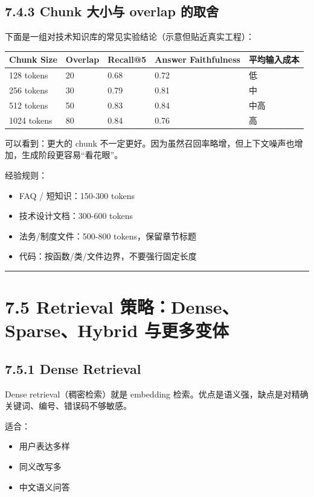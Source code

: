 \subsection{7.4.3 Chunk 大小与 overlap 的取舍}

下面是一组对技术知识库的常见实验结论（示意但贴近真实工程）：


\begingroup
\scriptsize
\setlength{\tabcolsep}{3pt}
\begin{longtable}{|p{}|p{}|p{}|p{}|p{}|}
\hline
Chunk Size & Overlap & Recall@5 & Answer Faithfulness & 平均输入成本 \\ \hline
128 tokens & 20 & 0.68 & 0.72 & 低 \\ \hline
256 tokens & 30 & 0.79 & 0.81 & 中 \\ \hline
512 tokens & 50 & 0.83 & 0.84 & 中高 \\ \hline
1024 tokens & 80 & 0.84 & 0.76 & 高 \\ \hline
\end{longtable}
\endgroup

可以看到：更大的 chunk 不一定更好。因为虽然召回率略增，但上下文噪声也增加，生成阶段更容易``看花眼''。


经验规则：


\begin{itemize}[leftmargin=2em]
\item FAQ / 短知识：150-300 tokens
\item 技术设计文档：300-600 tokens
\item 法务/制度文件：500-800 tokens，保留章节标题
\item 代码：按函数/类/文件边界，不要强行固定长度
\end{itemize}

\bigskip\hrule\bigskip

\section{7.5 Retrieval 策略：Dense、Sparse、Hybrid 与更多变体}

\subsection{7.5.1 Dense Retrieval}

Dense retrieval（稠密检索）就是 embedding 检索。优点是语义强，缺点是对精确关键词、编号、错误码不够敏感。


适合：


\begin{itemize}[leftmargin=2em]
\item 用户表达多样
\item 同义改写多
\item 中文语义问答
\end{itemize}

